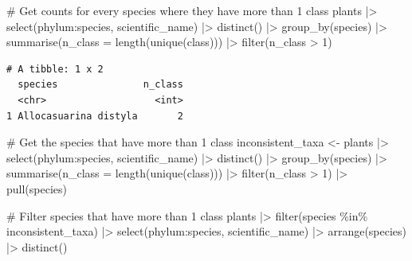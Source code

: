 \documentclass[
  letterpaper,
  DIV=11,
  numbers=noendperiod,
  oneside]{scrreprt}
\newenvironment{Shaded}{\begin{snugshade}}{\end{snugshade}}
\newcommand{\AttributeTok}[1]{\textcolor[rgb]{0.40,0.45,0.13}{#1}}
\newcommand{\CommentTok}[1]{\textcolor[rgb]{0.37,0.37,0.37}{#1}}
\newcommand{\DecValTok}[1]{\textcolor[rgb]{0.68,0.00,0.00}{#1}}
\newcommand{\FunctionTok}[1]{\textcolor[rgb]{0.28,0.35,0.67}{#1}}
\newcommand{\NormalTok}[1]{\textcolor[rgb]{0.00,0.23,0.31}{#1}}
\newcommand{\OtherTok}[1]{\textcolor[rgb]{0.00,0.23,0.31}{#1}}
\newcommand{\SpecialCharTok}[1]{\textcolor[rgb]{0.37,0.37,0.37}{#1}}
\begin{document}
\begin{Shaded}
\begin{Highlighting}[]
\CommentTok{\# Get counts for every species where they have more than 1 class}
\NormalTok{plants }\SpecialCharTok{|\textgreater{}} 
  \FunctionTok{select}\NormalTok{(phylum}\SpecialCharTok{:}\NormalTok{species, scientific\_name) }\SpecialCharTok{|\textgreater{}} 
  \FunctionTok{distinct}\NormalTok{() }\SpecialCharTok{|\textgreater{}} 
  \FunctionTok{group\_by}\NormalTok{(species) }\SpecialCharTok{|\textgreater{}} 
  \FunctionTok{summarise}\NormalTok{(}\AttributeTok{n\_class =} \FunctionTok{length}\NormalTok{(}\FunctionTok{unique}\NormalTok{(class))) }\SpecialCharTok{|\textgreater{}} 
  \FunctionTok{filter}\NormalTok{(n\_class }\SpecialCharTok{\textgreater{}} \DecValTok{1}\NormalTok{) }
\end{Highlighting}
\end{Shaded}

\begin{verbatim}
# A tibble: 1 x 2
  species               n_class
  <chr>                   <int>
1 Allocasuarina distyla       2
\end{verbatim}

\begin{Shaded}
\begin{Highlighting}[]
\CommentTok{\# Get the species that have more than 1 class}
\NormalTok{inconsistent\_taxa }\OtherTok{\textless{}{-}}\NormalTok{ plants }\SpecialCharTok{|\textgreater{}} 
  \FunctionTok{select}\NormalTok{(phylum}\SpecialCharTok{:}\NormalTok{species, scientific\_name) }\SpecialCharTok{|\textgreater{}} 
  \FunctionTok{distinct}\NormalTok{() }\SpecialCharTok{|\textgreater{}} 
  \FunctionTok{group\_by}\NormalTok{(species) }\SpecialCharTok{|\textgreater{}} 
  \FunctionTok{summarise}\NormalTok{(}\AttributeTok{n\_class =} \FunctionTok{length}\NormalTok{(}\FunctionTok{unique}\NormalTok{(class))) }\SpecialCharTok{|\textgreater{}} 
  \FunctionTok{filter}\NormalTok{(n\_class }\SpecialCharTok{\textgreater{}} \DecValTok{1}\NormalTok{) }\SpecialCharTok{|\textgreater{}} 
  \FunctionTok{pull}\NormalTok{(species) }

\CommentTok{\# Filter species that have more than 1 class}
\NormalTok{plants }\SpecialCharTok{|\textgreater{}} \FunctionTok{filter}\NormalTok{(species }\SpecialCharTok{\%in\%}\NormalTok{ inconsistent\_taxa) }\SpecialCharTok{|\textgreater{}} 
  \FunctionTok{select}\NormalTok{(phylum}\SpecialCharTok{:}\NormalTok{species, scientific\_name) }\SpecialCharTok{|\textgreater{}} 
  \FunctionTok{arrange}\NormalTok{(species) }\SpecialCharTok{|\textgreater{}} 
  \FunctionTok{distinct}\NormalTok{() }
\end{Highlighting}
\end{Shaded}
\end{document}

